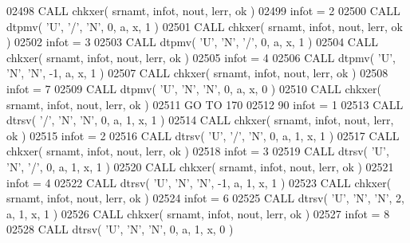 \begin{DoxyCode}
02498       \textcolor{keyword}{CALL }chkxer( srnamt, infot, nout, lerr, ok )
02499       infot = 2
02500       \textcolor{keyword}{CALL }dtpmv( \textcolor{stringliteral}{'U'}, \textcolor{stringliteral}{'/'}, \textcolor{stringliteral}{'N'}, 0, a, x, 1 )
02501       \textcolor{keyword}{CALL }chkxer( srnamt, infot, nout, lerr, ok )
02502       infot = 3
02503       \textcolor{keyword}{CALL }dtpmv( \textcolor{stringliteral}{'U'}, \textcolor{stringliteral}{'N'}, \textcolor{stringliteral}{'/'}, 0, a, x, 1 )
02504       \textcolor{keyword}{CALL }chkxer( srnamt, infot, nout, lerr, ok )
02505       infot = 4
02506       \textcolor{keyword}{CALL }dtpmv( \textcolor{stringliteral}{'U'}, \textcolor{stringliteral}{'N'}, \textcolor{stringliteral}{'N'}, -1, a, x, 1 )
02507       \textcolor{keyword}{CALL }chkxer( srnamt, infot, nout, lerr, ok )
02508       infot = 7
02509       \textcolor{keyword}{CALL }dtpmv( \textcolor{stringliteral}{'U'}, \textcolor{stringliteral}{'N'}, \textcolor{stringliteral}{'N'}, 0, a, x, 0 )
02510       \textcolor{keyword}{CALL }chkxer( srnamt, infot, nout, lerr, ok )
02511       \textcolor{keywordflow}{GO TO} 170
02512    90 infot = 1
02513       \textcolor{keyword}{CALL }dtrsv( \textcolor{stringliteral}{'/'}, \textcolor{stringliteral}{'N'}, \textcolor{stringliteral}{'N'}, 0, a, 1, x, 1 )
02514       \textcolor{keyword}{CALL }chkxer( srnamt, infot, nout, lerr, ok )
02515       infot = 2
02516       \textcolor{keyword}{CALL }dtrsv( \textcolor{stringliteral}{'U'}, \textcolor{stringliteral}{'/'}, \textcolor{stringliteral}{'N'}, 0, a, 1, x, 1 )
02517       \textcolor{keyword}{CALL }chkxer( srnamt, infot, nout, lerr, ok )
02518       infot = 3
02519       \textcolor{keyword}{CALL }dtrsv( \textcolor{stringliteral}{'U'}, \textcolor{stringliteral}{'N'}, \textcolor{stringliteral}{'/'}, 0, a, 1, x, 1 )
02520       \textcolor{keyword}{CALL }chkxer( srnamt, infot, nout, lerr, ok )
02521       infot = 4
02522       \textcolor{keyword}{CALL }dtrsv( \textcolor{stringliteral}{'U'}, \textcolor{stringliteral}{'N'}, \textcolor{stringliteral}{'N'}, -1, a, 1, x, 1 )
02523       \textcolor{keyword}{CALL }chkxer( srnamt, infot, nout, lerr, ok )
02524       infot = 6
02525       \textcolor{keyword}{CALL }dtrsv( \textcolor{stringliteral}{'U'}, \textcolor{stringliteral}{'N'}, \textcolor{stringliteral}{'N'}, 2, a, 1, x, 1 )
02526       \textcolor{keyword}{CALL }chkxer( srnamt, infot, nout, lerr, ok )
02527       infot = 8
02528       \textcolor{keyword}{CALL }dtrsv( \textcolor{stringliteral}{'U'}, \textcolor{stringliteral}{'N'}, \textcolor{stringliteral}{'N'}, 0, a, 1, x, 0 )

\end{DoxyCode}
